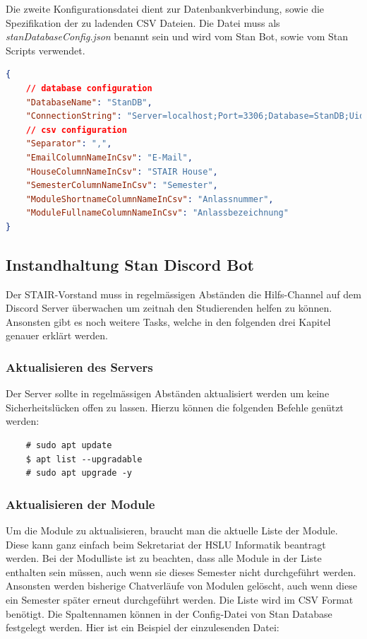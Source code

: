 \documentclass[a4paper, table]{article}
\begin{document}
Die zweite Konfigurationsdatei dient zur Datenbankverbindung,
sowie die Spezifikation der zu ladenden CSV Dateien.
Die Datei muss als \textit{stanDatabaseConfig.json} benannt sein und wird vom Stan Bot, sowie vom Stan Scripts verwendet.

\begin{lstlisting}[language=json]
{
    // database configuration
    "DatabaseName": "StanDB",
    "ConnectionString": "Server=localhost;Port=3306;Database=StanDB;Uid=stanDbAcc; Pwd=XXXXXXXXX;charset=utf8;",
    // csv configuration
    "Separator": ",",
    "EmailColumnNameInCsv": "E-Mail",
    "HouseColumnNameInCsv": "STAIR House",
    "SemesterColumnNameInCsv": "Semester",
    "ModuleShortnameColumnNameInCsv": "Anlassnummer",
    "ModuleFullnameColumnNameInCsv": "Anlassbezeichnung"
}
\end{lstlisting}

\newpage
\subsection{Instandhaltung Stan Discord Bot}

Der STAIR-Vorstand muss in regelmässigen Abständen die Hilfs-Channel auf dem Discord Server überwachen um zeitnah den Studierenden helfen zu können.
Ansonsten gibt es noch weitere Tasks, welche in den folgenden drei Kapitel genauer erklärt werden.

\subsubsection{Aktualisieren des Servers}

Der Server sollte in regelmässigen Abständen aktualisiert werden um keine Sicherheitslücken offen zu lassen.
Hierzu können die folgenden Befehle genützt werden:

\begin{lstlisting}
    # sudo apt update
    $ apt list --upgradable
    # sudo apt upgrade -y
\end{lstlisting}

\subsubsection{Aktualisieren der Module}

Um die Module zu aktualisieren, braucht man die aktuelle Liste der Module.
Diese kann ganz einfach beim Sekretariat der HSLU Informatik beantragt werden.
Bei der Modulliste ist zu beachten, dass alle Module in der Liste enthalten sein müssen, auch wenn sie dieses Semester nicht durchgeführt werden.
Ansonsten werden bisherige Chatverläufe von Modulen gelöscht, auch wenn diese ein Semester später erneut durchgeführt werden.
Die Liste wird im CSV Format benötigt.
Die Spaltennamen können in der Config-Datei von Stan Database festgelegt werden.
Hier ist ein Beispiel der einzulesenden Datei:
\end{document}

